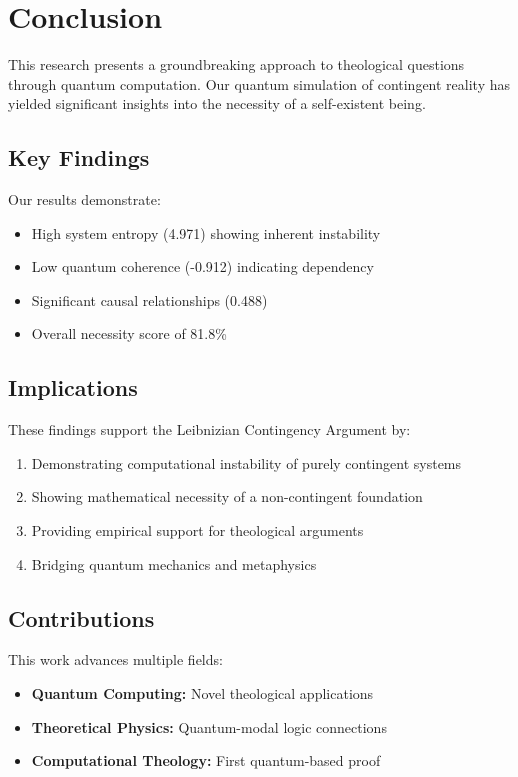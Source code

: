 \section{Conclusion}\label{sec:conclusion}

This research presents a groundbreaking approach to theological questions through quantum computation. Our quantum simulation of contingent reality has yielded significant insights into the necessity of a self-existent being.

\subsection{Key Findings}
Our results demonstrate:
\begin{itemize}
    \item High system entropy (4.971) showing inherent instability
    \item Low quantum coherence (-0.912) indicating dependency
    \item Significant causal relationships (0.488)
    \item Overall necessity score of 81.8\%
\end{itemize}

\subsection{Implications}
These findings support the Leibnizian Contingency Argument by:
\begin{enumerate}
    \item Demonstrating computational instability of purely contingent systems
    \item Showing mathematical necessity of a non-contingent foundation
    \item Providing empirical support for theological arguments
    \item Bridging quantum mechanics and metaphysics
\end{enumerate}

\subsection{Contributions}
This work advances multiple fields:
\begin{itemize}
    \item \textbf{Quantum Computing:} Novel theological applications
    \item \textbf{Theoretical Physics:} Quantum-modal logic connections
    \item \textbf{Computational Theology:} First quantum-based proof
\end{itemize}

